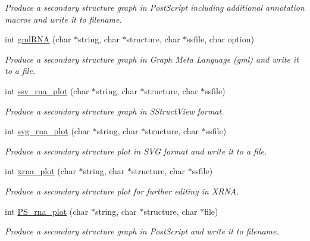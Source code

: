 \begin{DoxyCompactItemize}
\begin{DoxyCompactList}\small\item\em Produce a secondary structure graph in Post\+Script including additional annotation macros and write it to \textquotesingle{}filename\textquotesingle{}. \end{DoxyCompactList}\item 
int \mbox{\hyperlink{group__plotting__utils_ga70834bc8c0aad4fe6824ff76ccb8f329}{gml\+R\+NA}} (char $\ast$string, char $\ast$structure, char $\ast$ssfile, char option)
\begin{DoxyCompactList}\small\item\em Produce a secondary structure graph in Graph Meta Language (gml) and write it to a file. \end{DoxyCompactList}\item 
int \mbox{\hyperlink{group__plotting__utils_gadd368528755f9a830727b680243541df}{ssv\+\_\+rna\+\_\+plot}} (char $\ast$string, char $\ast$structure, char $\ast$ssfile)
\begin{DoxyCompactList}\small\item\em Produce a secondary structure graph in S\+Struct\+View format. \end{DoxyCompactList}\item 
int \mbox{\hyperlink{group__plotting__utils_gae7853539b5df98f294b4af434e979304}{svg\+\_\+rna\+\_\+plot}} (char $\ast$string, char $\ast$structure, char $\ast$ssfile)
\begin{DoxyCompactList}\small\item\em Produce a secondary structure plot in S\+VG format and write it to a file. \end{DoxyCompactList}\item 
int \mbox{\hyperlink{group__plotting__utils_ga2f6d5953e6a323df898896b8d6614483}{xrna\+\_\+plot}} (char $\ast$string, char $\ast$structure, char $\ast$ssfile)
\begin{DoxyCompactList}\small\item\em Produce a secondary structure plot for further editing in X\+R\+NA. \end{DoxyCompactList}\item 
int \mbox{\hyperlink{group__plotting__utils_ga0873c7cc4cd7a11c9a2cea19dde7e9c9}{P\+S\+\_\+rna\+\_\+plot}} (char $\ast$string, char $\ast$structure, char $\ast$file)
\begin{DoxyCompactList}\small\item\em Produce a secondary structure graph in Post\+Script and write it to \textquotesingle{}filename\textquotesingle{}. \end{DoxyCompactList}\item 

\end{DoxyCompactItemize}
